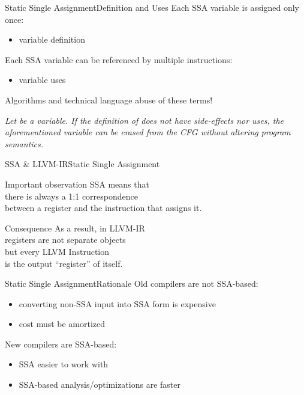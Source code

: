 \begin{frame}{Static Single Assignment}{Definition and Uses}
Each SSA variable is assigned only once:

\begin{itemize}
\item variable \alert{definition}
\end{itemize}

\vfill
Each SSA variable can be referenced by multiple instructions:

\begin{itemize}
\item variable \alert{uses}
\end{itemize}

\vfill
Algorithms and technical language abuse of these terms!

\vfill
\emph{
Let  be a variable. If the definition of  does not
have side-effects nor uses, the aforementioned  variable 
can be erased from the CFG without altering program semantics.
}
\end{frame}


\begin{frame}{SSA \& LLVM-IR}{Static Single Assignment}
\large
\begin{block}{\centering Important observation}
\centering
SSA means that\\
\alert{there is always a 1:1 correspondence}\\
\alert{between a register and the instruction that assigns it}.
\end{block}
\bigskip
\begin{block}{\centering Consequence}
\centering
As a result, in LLVM-IR\\
\alert{registers are not separate objects}\\
but \alert{every LLVM Instruction\\is the output ``register'' of itself}.
\end{block}
\end{frame}


\begin{frame}{Static Single Assignment}{Rationale}
Old compilers are not SSA-based:

\begin{itemize}
\item converting non-SSA input into SSA form is expensive
\item cost must be amortized
\end{itemize}

\bigskip
New compilers are SSA-based:

\begin{itemize}
\item SSA easier to work with
\item SSA-based analysis/optimizations are faster
\end{itemize}

%
\end{frame}


